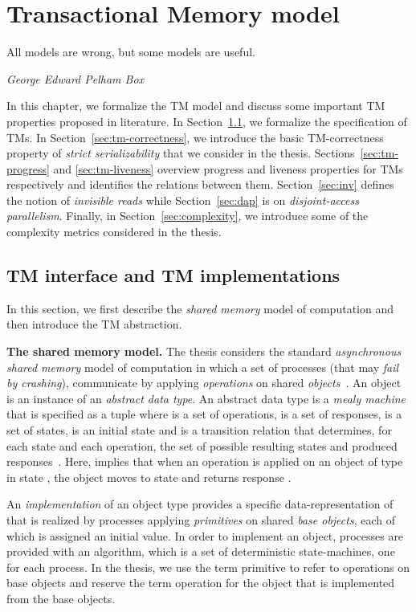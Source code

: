\chapter{Transactional Memory model}
\label{ch:tm-model}
\epigraph{All models are wrong, but some models are useful.}
{\textit{George Edward Pelham Box}}
In this chapter, we formalize the TM model and discuss some important TM properties proposed in literature.
In Section~\ref{sec:c21}, we formalize the specification of TMs.
In Section~\ref{sec:tm-correctness}, we introduce the basic TM-correctness property of \emph{strict serializability}
that we consider in the thesis.
Sections~\ref{sec:tm-progress} and \ref{sec:tm-liveness} overview progress and liveness properties for TMs
respectively and identifies the relations between them.
Section~\ref{sec:inv} defines the notion of \emph{invisible reads} while
Section~\ref{sec:dap} is on \emph{disjoint-access parallelism}.
Finally, in Section~\ref{sec:complexity}, we introduce some of the complexity metrics considered in the thesis.
\section{TM interface and TM implementations}
\label{sec:c21}
In this section, we first describe the \emph{shared memory} model of computation and then introduce the TM abstraction.

\vspace{1mm}\noindent\textbf{The shared memory model.}
The thesis considers the standard \emph{asynchronous shared memory} model of computation in which
a set of  processes (that may \emph{fail by crashing}), 
communicate by applying \emph{operations} on shared \emph{objects}~\cite{AGHK09}.
An object is an instance of an \emph{abstract data type}.
An abstract data type  is a \emph{mealy machine} that is specified as a tuple
 where
 is a set of operations,
 is a set of responses,  is a set of states,  is an
initial state and  
is a transition relation that determines, for each state
and each operation, the set of possible
resulting states and produced responses~\cite{AFHHT07}. 
Here,  implies that when
an operation  is applied on an object of type 
in state , the object moves to state  and returns response .

An \emph{implementation} of an object type  provides a specific data-representation of  that is realized by
processes applying \emph{primitives} on shared \emph{base objects}, each of which is assigned an initial value. 
In order to implement an object, processes are provided with an algorithm, which is a set of deterministic
state-machines, one for each process.
In the thesis, we use the term primitive to refer to operations on base objects and reserve the term operation
for the object that is implemented from the base objects.



